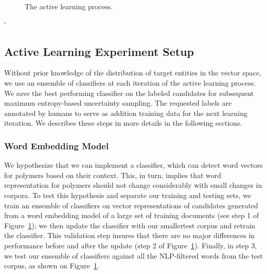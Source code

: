 \begin{figure}[!t]
\centering
{}
\caption{\label{fig:current} The active learning process. }
\end{figure}
`
\subsection{Active Learning Experiment Setup}

Without prior knowledge of the distribution of target entities in the vector space, we use an ensemble of classifiers at each iteration of the active learning process. 
We save the best performing classifier on the labeled candidates for subsequent maximum entropy-based uncertainty sampling. 
The requested labels are annotated by humans to serve as addition training data for the next learning iteration. 
We describes these steps in more details in the following sections.

\subsubsection{Word Embedding Model}
We hypothesize that we can implement a classifier, which can detect word vectors for polymers based on their context. 
This, in turn, implies that word representation for polymers should not change considerably with small changes in corpora.
To test this hypothesis and separate our training and testing sets, we train an ensemble of classifiers on vector representations of candidates generated from a word embedding model of a large set of training documents (see step 1 of Figure~\ref{fig:current}); 
we then update the classifier with our \textemdash smaller\textemdash test corpus and retrain the classifier. 
This validation step insures that there are no major differences in performance before and after the update (step 2 of Figure~\ref{fig:current}).
Finally, in step 3, we test our ensemble of classifiers against all the NLP-filtered words from the test corpus, as shown on Figure~\ref{fig:current}.

